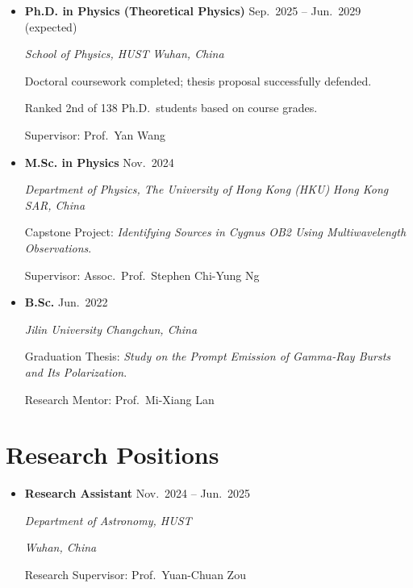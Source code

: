 \documentclass[letterpaper,11pt]{article}
\newlength{\cvEntryGap}
\newenvironment{cvEntries}{%
    \begin{itemize}[
        label={},
        leftmargin=0.15in,
        rightmargin=0pt,
        topsep=0pt,
        partopsep=0pt,
        parsep=0pt,
        itemsep=\cvEntryGap
    ]
}{%
    \end{itemize}
}
\newcommand{\cvDate}[1]{%
    {\small #1}%
}
\newcommand{\cvSchool}[1]{%
    {\small\itshape #1}%
}
\newcommand{\cvOrg}[1]{%
    {\small\itshape #1}%
}
\newcommand{\cvDetail}[2]{%
    {\small #1 #2}\par\vspace{1pt}%
}
\newcommand{\eduEntry}[4]{%
    \item
    \textbf{#1}\hfill\cvDate{#2}\par
    \cvSchool{#3}\hfill{\small\itshape #4}\par
}
\begin{document}
\begin{cvEntries}


    \eduEntry
    {Ph.D. in Physics (Theoretical Physics)}
    {Sep.\ 2025 -- Jun.\ 2029 (expected)}
    {School of Physics, HUST}
    {Wuhan, China}

    \cvDetail{}
    {Doctoral coursework completed;
    thesis proposal successfully defended.}

    \cvDetail{}
    {Ranked 2nd of 138 Ph.D.\ students
    based on course grades.}

    \cvDetail{Supervisor:}
    {Prof.\ Yan Wang}


    \eduEntry
    {M.Sc. in Physics}
    {Nov.\ 2024}
    {Department of Physics,
    The University of Hong Kong (HKU)}
    {Hong Kong SAR, China}

    \cvDetail{Capstone Project:}
    {\textit{Identifying Sources in Cygnus OB2
    Using Multiwavelength Observations}.}

    \cvDetail{Supervisor:}
    {Assoc.\ Prof.\ Stephen Chi-Yung Ng}


    \eduEntry
    {B.Sc.}
    {Jun.\ 2022}
    {Jilin University}
    {Changchun, China}

    \cvDetail{Graduation Thesis:}
    {\textit{Study on the Prompt Emission
    of Gamma-Ray Bursts and Its Polarization}.}

    \cvDetail{Research Mentor:}
    {Prof.\ Mi-Xiang Lan}

\end{cvEntries}


\section{Research Positions}

\begin{cvEntries}

    \item
    \textbf{Research Assistant}
    \hfill
    \cvDate{Nov.\ 2024 -- Jun.\ 2025}
    \par

    \cvOrg{Department of Astronomy, HUST}
    \hfill
    {\small\itshape Wuhan, China}
    \par

    \cvDetail{Research Supervisor:}
    {Prof.\ Yuan-Chuan Zou}

\end{cvEntries}
\end{document}
